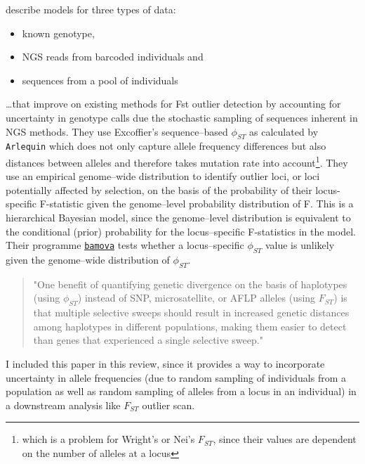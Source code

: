\documentclass{article}\usepackage[]{graphicx}\usepackage[]{color}
\begin{document}
\cite{Gompert2011a} describe models for three types of data: 

\begin{itemize}
\item known genotype, 
\item NGS reads from barcoded individuals and 
\item sequences from a pool of individuals
\end{itemize}

\ldots that improve on existing methods for Fst outlier detection by accounting for uncertainty in genotype calls due the stochastic sampling of sequences inherent in NGS methods. They use Excoffier's sequence--based $\phi_{ST}$ as calculated by \texttt{Arlequin} which does not only capture allele frequency differences but also distances between alleles and therefore takes mutation rate into account\footnote{which is a problem for Wright's or Nei's $F_{ST}$, since their values are dependent on the number of alleles at a locus}. They use an empirical genome--wide distribution to identify outlier loci, or loci potentially affected by selection, on the basis of the probability of their locus-specific F-statistic given the genome--level probability distribution of F. This is a hierarchical Bayesian model, since the genome--level distribution is equivalent to the conditional (prior) probability for the locus--specific F-statistics in the model. Their programme \href{http://www.uwyo.edu/buerkle/software/bamova/}{\texttt{bamova}} tests whether a locus--specific $\phi_{ST}$ value is unlikely given the genome--wide distribution of $\phi_{ST}$.

\begin{quote}
"One benefit of quantifying genetic divergence on the basis of haplotypes (using $\phi_{ST}$) instead of SNP, microsatellite, or AFLP alleles (using $F_{ST}$) is that multiple selective sweeps should result in increased genetic distances among haplotypes in different populations, making them easier to detect than genes that experienced a single selective sweep."
\end{quote}

I included this paper in this review, since it provides a way to incorporate uncertainty in allele frequencies (due to random sampling of individuals from a population as well as random sampling of alleles from a locus in an individual) in a downstream analysis like $F_{ST}$ outlier scan.
\end{document}

